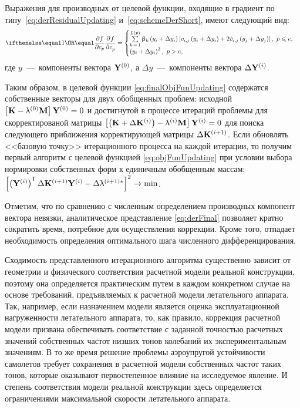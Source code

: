 Выражения для производных от целевой функции, входящие в градиент по типу~\eqref{eq:derResidualUpdating} и~\eqref{eq:schemeDerShort}, имеют следующий вид:
\begin{equation}
	\partDer{f}{c_p}{} = 
	\begin{cases}
		\sum\limits_{k\,=\,1} ^ {L(p)} \beta_k \rbrackets{y_i + \Delta y_i} \sbrackets{v_{i, j} \rbrackets{y_i + \Delta y_i} + 2 \tilde{v}_{i, j} \rbrackets{y_j + \Delta y_j}}, \ p \leq e, \\
		\rbrackets{y_i + \Delta y_i} ^ 2, \ p > e,
	\end{cases} \label{eq:derFinal}
\end{equation}
где $ y $~---~компоненты вектора $ \mathbf{Y} ^ {(0)} $, а $ \Delta y $~---~компоненты вектора $ \Delta \mathbf{Y} ^ {(i)} $.

Таким образом, в целевой функции \eqref{eq:finalObjFunUpdating} содержатся собственные векторы для двух обобщенных проблем: исходной $ \left[ \mathbf{K} - \uplambda ^ {(0)} \mathbf{M} \right] \mathbf{Y} ^ {(0)} = 0 $ и достигнутой в процессе итераций проблемы для скорректированой матрицы $ \left[ \left( \mathbf{K} + \Delta \mathbf{K} ^ {(i)} \right) - \uplambda ^ {(i)} \mathbf{M} \right] \mathbf{Y} ^ {(i)} = 0 $ для поиска следующего приближения корректирующей матрицы $ \Delta \mathbf{K} ^ {(i + 1)} $. Если обновлять <<базовую точку>> итерационного процесса на каждой итерации, то получим первый алгоритм с целевой функцией \eqref{eq:objFunUpdating} при условии выбора нормировки собственных форм к единичным обобщенным массам: $ \left[ \left( \mathbf{Y} ^ {(i)} \right) ^ \mathsf{T} \Delta \mathbf{K} ^ {(i + 1)} \mathbf{Y} ^ {(i)} - \Delta \uplambda ^ {(i + 1) \ast} \right] ^ 2 \rightarrow \min $.

Отметим, что по сравнению с численным определением производных компонент вектора невязки, аналитическое представление \eqref{eq:derFinal} позволяет кратно сократить время, потребное для осуществления коррекции. Кроме того, отпадает необходимость определения оптимального шага численного дифференцирования.

Сходимость представленного итерационного алгоритма существенно зависит от геометрии и физического соответствия расчетной модели реальной конструкции, поэтому она определяется практическим путем в каждом конкретном случае на основе требований, предъявляемых к расчетной модели летательного аппарата. Так, например, если назначением модели является оценка эксплуатационной нагруженности летательного аппарата, то, как правило, коррекция расчетной модели призвана обеспечивать соответствие с заданной точностью расчетных значений собственных частот низших тонов колебаний их экспериментальным значениям. В то же время решение проблемы аэроупругой устойчивости самолетов требует сохранения в расчетной модели собственных частот таких тонов, которые оказывают первостепенное влияние на исследуемое явление. И степень соответствия модели реальной конструкции здесь определяется ограничениями максимальной скорости летательного аппарата.

